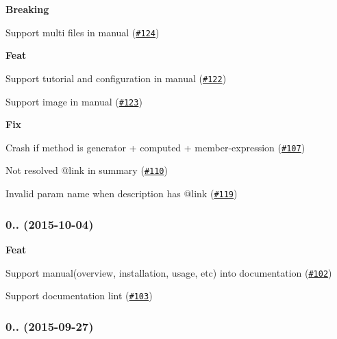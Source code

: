 \begin{DoxyItemize}
\item {\bfseries Breaking}
\begin{DoxyItemize}
\item Support multi files in manual (\href{https://github.com/esdoc/esdoc/issues/124}{\tt \#124})
\end{DoxyItemize}
\item {\bfseries Feat}
\begin{DoxyItemize}
\item Support tutorial and configuration in manual (\href{https://github.com/esdoc/esdoc/issues/122}{\tt \#122})
\item Support image in manual (\href{https://github.com/esdoc/esdoc/issues/123}{\tt \#123})
\end{DoxyItemize}
\item {\bfseries Fix}
\begin{DoxyItemize}
\item Crash if method is generator + computed + member-\/expression (\href{https://github.com/esdoc/esdoc/issues/107}{\tt \#107})
\item Not resolved {\ttfamily @link} in summary (\href{https://github.com/esdoc/esdoc/issues/110}{\tt \#110})
\item Invalid param name when description has {\ttfamily @link} (\href{https://github.com/esdoc/esdoc/issues/119}{\tt \#119})
\end{DoxyItemize}
\end{DoxyItemize}

\subsubsection*{0.. (2015-\/10-\/04)}


\begin{DoxyItemize}
\item {\bfseries Feat}
\begin{DoxyItemize}
\item Support manual(overview, installation, usage, etc) into documentation (\href{https://github.com/esdoc/esdoc/issues/102}{\tt \#102})
\item Support documentation lint (\href{https://github.com/esdoc/esdoc/issues/103}{\tt \#103})
\end{DoxyItemize}
\end{DoxyItemize}

\subsubsection*{0.. (2015-\/09-\/27)}



